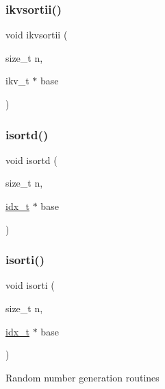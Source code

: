 \mbox{\label{a00209_a1cc6186193b50112216341c8f7009826}} 
\subsubsection{\texorpdfstring{ikvsortii()}{ikvsortii()}}
{\footnotesize\ttfamily void ikvsortii (\begin{DoxyParamCaption}\item[{size\+\_\+t}]{n,  }\item[{ikv\+\_\+t $\ast$}]{base }\end{DoxyParamCaption})}

\mbox{\label{a00209_afe96a5fa1a6a4a60a13fe221567a793c}} 
\subsubsection{\texorpdfstring{isortd()}{isortd()}}
{\footnotesize\ttfamily void isortd (\begin{DoxyParamCaption}\item[{size\+\_\+t}]{n,  }\item[{\hyperlink{a00876_aaa5262be3e700770163401acb0150f52}{idx\+\_\+t} $\ast$}]{base }\end{DoxyParamCaption})}

\mbox{\label{a00209_afc154279aa00bea9ce5c90b8c6906cc6}} 
\subsubsection{\texorpdfstring{isorti()}{isorti()}}
{\footnotesize\ttfamily void isorti (\begin{DoxyParamCaption}\item[{size\+\_\+t}]{n,  }\item[{\hyperlink{a00876_aaa5262be3e700770163401acb0150f52}{idx\+\_\+t} $\ast$}]{base }\end{DoxyParamCaption})}

Random number generation routines

